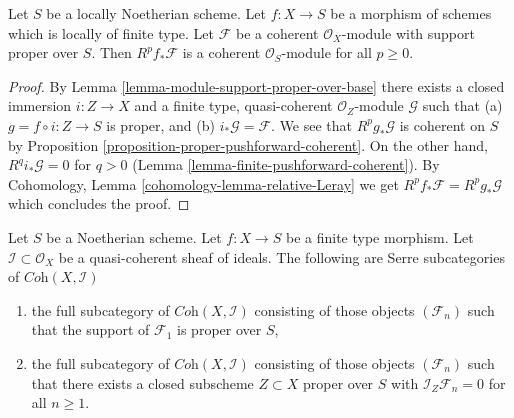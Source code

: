 \begin{lemma}
\label{lemma-support-proper-over-base-pushforward}
Let $S$ be a locally Noetherian scheme.
Let $f : X \to S$ be a morphism of schemes which is locally of finite type.
Let $\mathcal{F}$ be a coherent $\mathcal{O}_X$-module
with support proper over $S$. Then $R^pf_*\mathcal{F}$
is a coherent $\mathcal{O}_S$-module for all $p \geq 0$.
\end{lemma}

\begin{proof}
By Lemma \ref{lemma-module-support-proper-over-base}
there exists a closed immersion $i : Z \to X$ and
a finite type, quasi-coherent $\mathcal{O}_Z$-module
$\mathcal{G}$ such that (a) $g = f \circ i : Z \to S$ is proper, and (b)
$i_*\mathcal{G} = \mathcal{F}$.
We see that $R^pg_*\mathcal{G}$ is coherent on $S$ by
Proposition \ref{proposition-proper-pushforward-coherent}.
On the other hand, $R^qi_*\mathcal{G} = 0$ for $q > 0$
(Lemma \ref{lemma-finite-pushforward-coherent}).
By Cohomology, Lemma \ref{cohomology-lemma-relative-Leray}
we get $R^pf_*\mathcal{F} = R^pg_*\mathcal{G}$ which concludes the proof.
\end{proof}

\begin{lemma}
\label{lemma-systems-with-proper-support}
Let $S$ be a Noetherian scheme. Let $f : X \to S$ be a finite type morphism.
Let $\mathcal{I} \subset \mathcal{O}_X$ be
a quasi-coherent sheaf of ideals. The following are Serre subcategories
of $\textit{Coh}(X, \mathcal{I})$
\begin{enumerate}
\item the full subcategory of $\textit{Coh}(X, \mathcal{I})$
consisting of those objects $(\mathcal{F}_n)$ such that
the support of $\mathcal{F}_1$ is proper over $S$,
\item the full subcategory of $\textit{Coh}(X, \mathcal{I})$
consisting of those objects $(\mathcal{F}_n)$ such that
there exists a closed subscheme $Z \subset X$ proper over $S$
with $\mathcal{I}_Z \mathcal{F}_n = 0$ for all $n \geq 1$.
\end{enumerate}
\end{lemma}


